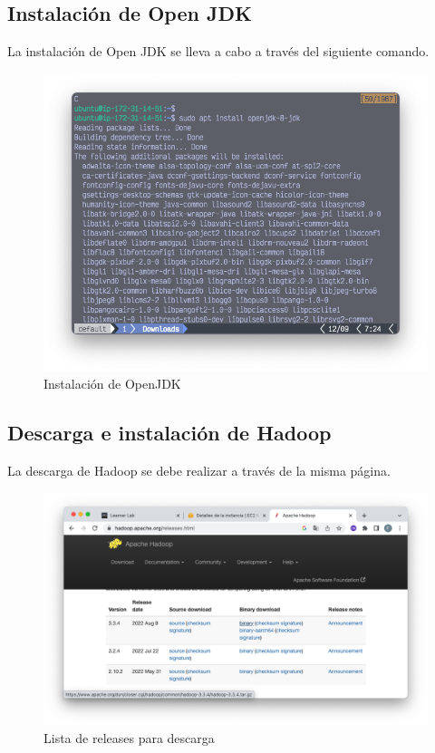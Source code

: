 \clearpage

\subsection{Instalación de Open JDK}
La instalación de Open JDK se lleva a cabo a través del siguiente comando.
\begin{figure}[h]
	\centering
	\includegraphics[scale=.35] {img/15-installJdk}
	\caption{Instalación de OpenJDK}
	\label{fig:15}	
\end{figure}
\clearpage

\subsection{Descarga e instalación de Hadoop}
La descarga de Hadoop se debe realizar  a través de la misma página. 
\begin{figure}[h]
	\centering
	\includegraphics[scale=.35] {img/16-webpageHadoop}
	\caption{Lista de releases para descarga}
	\label{fig:16}	
\end{figure}


